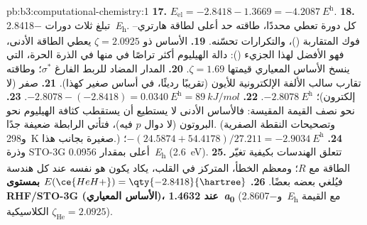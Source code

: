 \begin{solution}{pb:b3:computational-chemistry:1}
\textbf{17.} $E_{\mathrm{el}} = -2.8418 - 1.3669 = \qty{-4.2087}{\hartree}$.
\textbf{18.} تبلغ ثلاث دورات \qty{-2.8418}{\hartree}. كل دورة تعطي
محددًا، طاقته حد أعلى لطاقة هارتري--فوك المتقاربة
()، والتكرارات تحسّنه.
\textbf{19.} الأساس ذو $\zeta = 2.0925$ يعطي الطاقة الأدنى، فهو
الأفضل لهذا الجزيء (): دالة الهيليوم
أكثر تراصًا في  منها في الذرة الحرة، التي ينسخ الأساس المعياري
قيمتها $\zeta = 1.69$.
\textbf{20.} المدار المضاد للربط الفارغ $\sigma^*$؛ وطاقته تقارب
سالب الألفة الإلكترونية للأيون  (تقريبًا رديئًا، في أساس صغير كهذا).
\textbf{21.} صفر (لا إلكترون)؛ $\qty{-2.8078}{\hartree}$.
\textbf{22.} $-2.8078 - (-2.8418) = \qty{0.0340}{\hartree} = \qty{89}{kJ/mol}$.
\textbf{23.} نحو نصف القيمة المقيسة: فالأساس الأدنى لا يستطيع أن يستقطب
كثافة الهيليوم نحو البروتون (لا دوال $p$ فيه)، فتأتي الرابطة
ضعيفة جدًا. (وتصحيحات النقطة الصفرية و\qty{298}{K} صغيرة بجانب هذا.)
\textbf{24.} $-(24.5874 + 54.4178)/27.211 = \qty{-2.9034}{\hartree}$؛ وذرة STO-3G
أعلى بمقدار \qty{0.0956}{\hartree} (\qty{2.6}{eV}).
\textbf{25.} تتعلق الهندسات بكيفية تغيّر الطاقة مع $R$؛ ومعظم
الخطأ، المتركز في القلب، يكاد يكون هو نفسه عند كل هندسة
فيُلغي بعضه بعضًا.
\textbf{26.} \textbf{$E(\ce{HeH+}) = \qty{-2.8418}{\hartree}$ بمستوى RHF/STO-3G (الأساس
المعياري)، عند \qty{1.4632}{\bohr}} (و\qty{-2.8607}{\hartree} مع القيمة الكلاسيكية
$\zeta_{\mathrm{He}} = 2.0925$).
\end{solution}
